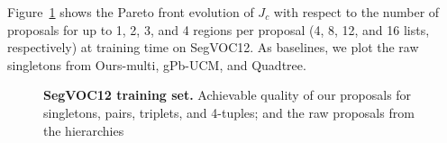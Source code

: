 \documentclass[10pt,journal,cspaper,compsoc]{IEEEtran}
\begin{document}


Figure~\ref{fig:obj_cands_train} shows the Pareto front evolution of $J_c$ with respect to the
number of proposals for up to 1, 2, 3, and 4 regions per proposal
(4, 8, 12, and 16 lists, respectively) at training time on SegVOC12.
As baselines, we plot the raw singletons from Ours-multi, gPb-UCM, and Quadtree.

\begin{figure}
\scalebox{0.87}{}
\caption{\textbf{SegVOC12 training set.} Achievable quality of our proposals for singletons, pairs, triplets, and 4-tuples; and the raw proposals from the hierarchies}
\label{fig:obj_cands_train}
\vspace{-2mm}
\end{figure}
\end{document}
